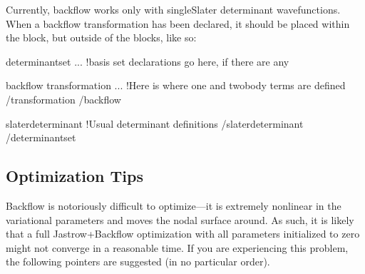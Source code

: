 \documentclass[letterpaper,10pt,english]{sphinxmanual}
\begin{document}
Currently, backflow works only with single\sphinxhyphen{}Slater determinant wavefunctions.  When a backflow transformation has been declared, it should be placed within the  block, but outside of the  blocks, like so:

\begin{sphinxVerbatim}[commandchars=\\\{\}]
\PYGZlt{}determinantset ... \PYGZgt{}
    \PYGZlt{}!\PYGZhy{}\PYGZhy{}basis set declarations go here, if there are any \PYGZhy{}\PYGZhy{}\PYGZgt{}

    \PYGZlt{}backflow\PYGZgt{}
        \PYGZlt{}transformation ...\PYGZgt{}
          \PYGZlt{}!\PYGZhy{}\PYGZhy{}Here is where one and two\PYGZhy{}body terms are defined \PYGZhy{}\PYGZhy{}\PYGZgt{}
         \PYGZlt{}/transformation\PYGZgt{}
     \PYGZlt{}/backflow\PYGZgt{}

     \PYGZlt{}slaterdeterminant\PYGZgt{}
         \PYGZlt{}!\PYGZhy{}\PYGZhy{}Usual determinant definitions \PYGZhy{}\PYGZhy{}\PYGZgt{}
     \PYGZlt{}/slaterdeterminant\PYGZgt{}
 \PYGZlt{}/determinantset\PYGZgt{}
\end{sphinxVerbatim}


\subsection{Optimization Tips}
\label{\detokenize{intro_wavefunction:optimization-tips}}
Backflow is notoriously difficult to optimize—it is extremely nonlinear in the variational parameters and moves the nodal surface around.  As such, it is likely that a full Jastrow+Backflow optimization with all parameters initialized to zero might not converge in a reasonable time.  If you are experiencing this problem, the following pointers are suggested (in no particular order).
\end{document}

